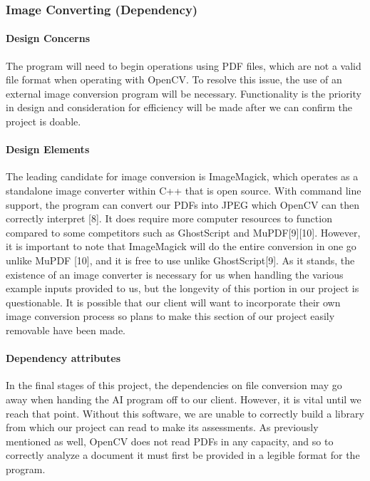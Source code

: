 \documentclass[article, onecolumn, draftclsnofoot,10pt, compsoc]{IEEEtran}
\begin{document}
\subsubsection{Image Converting (Dependency)}
\paragraph{Design Concerns}
The program will need to begin operations using PDF files, which are not a valid file format when operating with OpenCV. To resolve this issue, the use of an external image conversion program will be necessary. Functionality is the priority in design and consideration for efficiency will be made after we can confirm the project is doable. 

\paragraph{Design Elements}
The leading candidate for image conversion is ImageMagick, which operates as a standalone image converter within C++ that is open source. With command line support, the program can convert our PDFs into JPEG which OpenCV can then correctly interpret [8]. It does require more computer resources to function compared to some competitors such as GhostScript and MuPDF[9][10]. However, it is important to note that ImageMagick will do the entire conversion in one go unlike MuPDF [10], and it is free to use unlike GhostScript[9]. As it stands, the existence of an image converter is necessary for us when handling the various example inputs provided to us, but the longevity of this portion in our project is questionable. It is possible that our client will want to incorporate their own image conversion process so plans to make this section of our project easily removable have been made.

\paragraph{Dependency attributes}
In the final stages of this project, the dependencies on file conversion may go away when handing the AI program off to our client. However, it is vital until we reach that point. Without this software, we are unable to correctly build a library from which our project can read to make its assessments. As previously mentioned as well, OpenCV does not read PDFs in any capacity, and so to correctly analyze a document it must first be provided in a legible format for the program.
\end{document}
